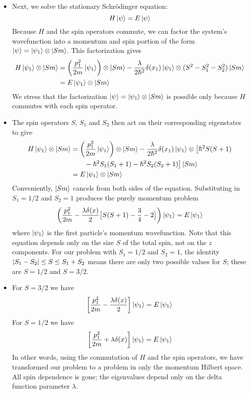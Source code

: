 \documentclass[11pt, a4paper]{article}
\newcommand{\schro}{Schr\"{o}dinger\xspace}
\begin{document}
\begin{itemize}
	\item Next, we solve the stationary \schro equation:
	\begin{equation*}
		H \ket{\psi} = E\ket{\psi}
	\end{equation*}
	Because $ H $ and the spin operators commute, we can factor the system's wavefunction into a momentum and spin portion of the form $ \ket{\psi} = \ket{\psi_{1}} \otimes \ket{Sm} $. This factorization gives
	\begin{align*}
		H \ket{\psi_{1}} \otimes \ket{Sm} &= \left(\frac{p_{1}^{2}}{2m}\ket{\psi_{1}}\right)\otimes \ket{Sm} - \frac{\lambda}{2\hbar^{2}} \delta (x_{1})\ket{\psi_{1}}\otimes (S^{2} -S_{1}^{2} - S_{2}^{2}) \ket{Sm}\\
		&= E \ket{\psi_{1}}\otimes \ket{Sm}
	\end{align*}
	We stress that the factorization $ \ket{\psi} = \ket{\psi_{1}} \otimes \ket{Sm} $ is possible only because $ H $ commutes with each spin operator.
	
	\item The spin operators $ S $, $ S_{1} $ and $ S_{2} $ then act on their corresponding eigenstates to give
	\begin{align*}
		H \ket{\psi_{1}} \otimes \ket{Sm} &= \left(\frac{p_{1}^{2}}{2m}\ket{\psi_{1}}\right)\otimes \ket{Sm} - \frac{\lambda}{2\hbar^{2}} \delta (x_{1})\ket{\psi_{1}}\otimes \big[\hbar^{2}S(S+1) \\
		&{} \qquad  - \hbar^{2}S_{1}(S_{1} + 1) - \hbar^{2}S_{2}(S_{2} + 1)\big] \ket{Sm} \\
		&= E \ket{\psi_{1}}\otimes \ket{Sm}
	\end{align*}
	Conveniently, $ \ket{Sm} $ cancels from both sides of the equation. Substituting in $ S_{1} = 1/2 $ and $ S_{2} = 1 $ produces the purely momentum problem
	\begin{equation*}
		\left(\frac{p_{1}^{2}}{2m} - \frac{\lambda \delta(x)}{2}\big[S(S+1) - \frac{3}{4} - 2\big]\right)\ket{\psi_{1}} = E \ket{\psi_{1}}
	\end{equation*}
	where $ \ket{\psi_{1}} $ is the first particle's momentum wavefunction. Note that this equation depends only on the size $ S $ of the total spin, not on the $ z $ components. For our problem with $ S_{1} = 1/2 $ and $ S_{2} = 1 $, the identity $ \abs{S_{1} - S_{2}} \leq S \leq S_{1} + S_{2} $ means there are only two possible values for $ S $; these are $ S = 1/2 $ and $ S = 3/2 $. 
	
	\item For $ S = 3/2 $ we have
	\begin{equation*}
		\left[\frac{p_{1}^{2}}{2m} - \frac{\lambda \delta(x)}{2}\right]\ket{\psi_{1}} = E \ket{\psi_{1}}
	\end{equation*}
	For $ S = 1/2 $ we have
	\begin{equation*}
		\left[\frac{p_{1}^{2}}{2m} + \lambda \delta(x)\right]\ket{\psi_{1}} = E \ket{\psi_{1}}
	\end{equation*}
	In other words, using the commutation of $ H $ and the spin operators, we have transformed our problem to a problem in only the momentum Hilbert space. All spin dependence is gone; the eigenvalues depend only on the delta function parameter $ \lambda $. 
	

\end{itemize}
\end{document}

